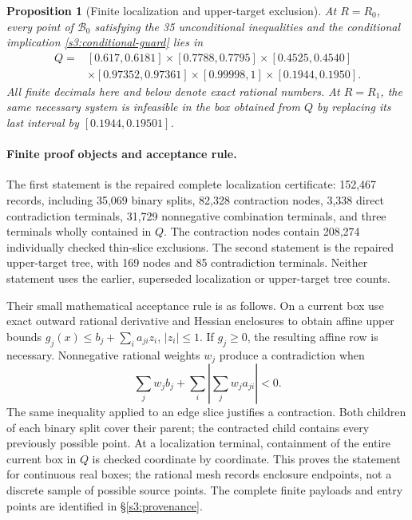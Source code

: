 \documentclass[11pt,reqno]{amsart}
\newtheorem{proposition}[theorem]{Proposition}
\theoremstyle{definition}
\theoremstyle{remark}
\begin{document}
\begin{proposition}[Finite localization and upper-target exclusion]
\label{s3:finite-localization}
At \(R=R_0\), every point of \(\mathcal B_0\) satisfying the
35 unconditional inequalities and the conditional implication
\eqref{s3:conditional-guard} lies in
\begin{equation}\label{s3:Q}
\begin{split}
 Q={}&[0.617,0.6181]\times[0.7788,0.7795]
      \times[0.4525,0.4540]\\
   &\times[0.97352,0.97361]\times[0.99998,1]
      \times[0.1944,0.1950].
\end{split}
\end{equation}
All finite decimals here and below denote exact rational numbers.
At \(R=R_1\), the same necessary system is infeasible in the box
obtained from \(Q\) by replacing its last interval by
\([0.1944,0.19501]\).
\end{proposition}

\paragraph{Finite proof objects and acceptance rule.}
The first statement is the repaired complete localization certificate:
152,467 records, including 35,069 binary splits, 82,328 contraction
nodes, 3,338 direct contradiction terminals, 31,729 nonnegative
combination terminals, and three terminals wholly contained in \(Q\).
The contraction nodes contain 208,274 individually checked thin-slice
exclusions. The second statement is the repaired upper-target tree,
with 169 nodes and 85 contradiction terminals. Neither statement
uses the earlier, superseded localization or upper-target tree counts.

Their small mathematical acceptance rule is as follows. On a current
box use exact outward rational derivative and Hessian enclosures to
obtain affine upper bounds
\(g_j(x)\le b_j+\sum_i a_{ji}z_i\), \(|z_i|\le1\).
If \(g_j\ge0\), the resulting affine row is necessary. Nonnegative
rational weights \(w_j\) produce a contradiction when
\[
 \sum_jw_jb_j+\sum_i\left|\sum_jw_ja_{ji}\right|<0.
\]
The same inequality applied to an edge slice justifies a contraction.
Both children of each binary split cover their parent; the contracted
child contains every previously possible point. At a localization
terminal, containment of the entire current box in \(Q\) is
checked coordinate by coordinate. This proves the statement for
continuous real boxes; the rational mesh records enclosure endpoints,
not a discrete sample of possible source points. The complete finite
payloads and entry points are identified in \S\ref{s3:provenance}.
\end{document}
